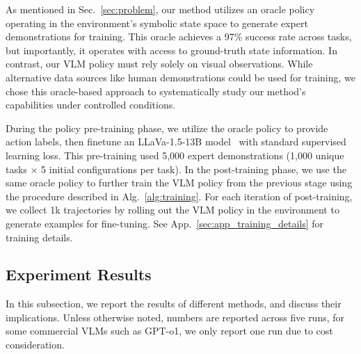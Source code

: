 As mentioned in Sec.~\ref{sec:problem}, our method utilizes an oracle policy operating in the environment's symbolic state space to generate expert demonstrations for training. This oracle achieves a 97\% success rate across tasks, but importantly, it operates with access to ground-truth state information. In contrast, our VLM policy must rely solely on visual observations. While alternative data sources like human demonstrations could be used for training, we chose this oracle-based approach to systematically study our method's capabilities under controlled conditions.

During the policy pre-training phase, we utilize the oracle policy to provide action labels, then finetune an LLaVa-1.5-13B model~\cite{llava, llava1.5} with standard supervised learning loss. This pre-training used 5,000 expert demonstrations (1,000 unique tasks × 5 initial configurations per task). In the post-training phase, we use the same oracle policy to further train the VLM policy from the previous stage using the procedure described in Alg.~\ref{alg:training}. For each iteration of post-training, we collect 1k trajectories by rolling out the VLM policy in the environment to generate examples for fine-tuning. See App.~\ref{sec:app_training_details} for training details.


\subsection{Experiment Results}
In this subsection,  we report the results of different methods, and discuss their implications. Unless otherwise noted, numbers are reported across five runs, for some commercial VLMs such as GPT-o1, we only report one run due to cost consideration. 


